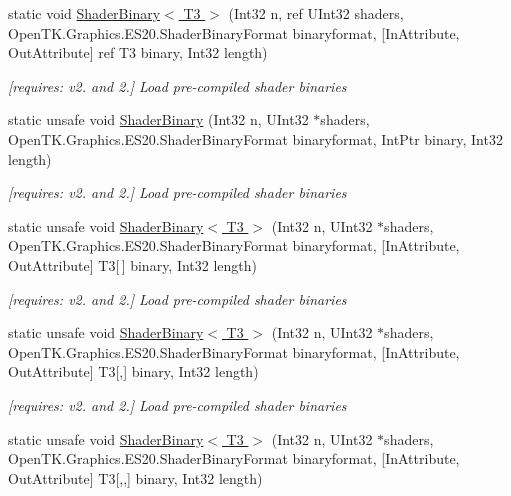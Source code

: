 \begin{DoxyCompactItemize}
static void \hyperlink{class_open_t_k_1_1_graphics_1_1_e_s20_1_1_g_l_ab35d2d4cd177c0e030decfea417c7879}{Shader\-Binary$<$ T3 $>$} (Int32 n, ref U\-Int32 shaders, Open\-T\-K.\-Graphics.\-E\-S20.\-Shader\-Binary\-Format binaryformat, \mbox{[}In\-Attribute, Out\-Attribute\mbox{]} ref T3 binary, Int32 length)
\begin{DoxyCompactList}\small\item\em \mbox{[}requires\-: v2. and 2.\mbox{]} Load pre-\/compiled shader binaries \end{DoxyCompactList}\item 
static unsafe void \hyperlink{class_open_t_k_1_1_graphics_1_1_e_s20_1_1_g_l_aba33475fd5e1e89e6700506f1de5cdae}{Shader\-Binary} (Int32 n, U\-Int32 $\ast$shaders, Open\-T\-K.\-Graphics.\-E\-S20.\-Shader\-Binary\-Format binaryformat, Int\-Ptr binary, Int32 length)
\begin{DoxyCompactList}\small\item\em \mbox{[}requires\-: v2. and 2.\mbox{]} Load pre-\/compiled shader binaries \end{DoxyCompactList}\item 
static unsafe void \hyperlink{class_open_t_k_1_1_graphics_1_1_e_s20_1_1_g_l_aad2c72da96e975e9480f0e05550fd1db}{Shader\-Binary$<$ T3 $>$} (Int32 n, U\-Int32 $\ast$shaders, Open\-T\-K.\-Graphics.\-E\-S20.\-Shader\-Binary\-Format binaryformat, \mbox{[}In\-Attribute, Out\-Attribute\mbox{]} T3\mbox{[}$\,$\mbox{]} binary, Int32 length)
\begin{DoxyCompactList}\small\item\em \mbox{[}requires\-: v2. and 2.\mbox{]} Load pre-\/compiled shader binaries \end{DoxyCompactList}\item 
static unsafe void \hyperlink{class_open_t_k_1_1_graphics_1_1_e_s20_1_1_g_l_a10339c731aee9e33f77cf4c086e1040c}{Shader\-Binary$<$ T3 $>$} (Int32 n, U\-Int32 $\ast$shaders, Open\-T\-K.\-Graphics.\-E\-S20.\-Shader\-Binary\-Format binaryformat, \mbox{[}In\-Attribute, Out\-Attribute\mbox{]} T3\mbox{[},\mbox{]} binary, Int32 length)
\begin{DoxyCompactList}\small\item\em \mbox{[}requires\-: v2. and 2.\mbox{]} Load pre-\/compiled shader binaries \end{DoxyCompactList}\item 
static unsafe void \hyperlink{class_open_t_k_1_1_graphics_1_1_e_s20_1_1_g_l_a3486f729b43ccfcb853b2a10188ff1af}{Shader\-Binary$<$ T3 $>$} (Int32 n, U\-Int32 $\ast$shaders, Open\-T\-K.\-Graphics.\-E\-S20.\-Shader\-Binary\-Format binaryformat, \mbox{[}In\-Attribute, Out\-Attribute\mbox{]} T3\mbox{[},,\mbox{]} binary, Int32 length)

\end{DoxyCompactItemize}
